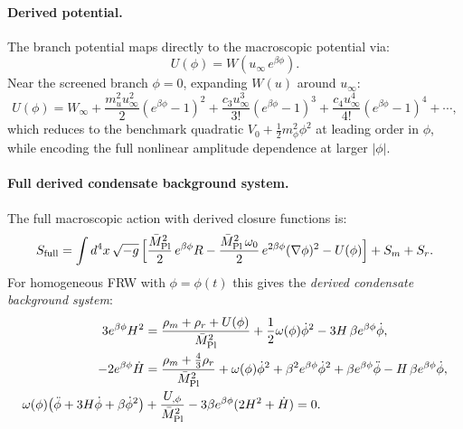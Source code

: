 \documentclass[11pt,a4paper]{article}
\numberwithin{equation}{section}
\begin{document}
\paragraph{Derived potential.}
The branch potential maps directly to the macroscopic potential via:
\begin{equation}
\boxed{U(\phi) = W(u_\infty\,e^{\beta\phi}).}
\label{eq:derived_potential}
\end{equation}
Near the screened branch $\phi=0$, expanding $W(u)$ around $u_\infty$:
\begin{equation}
U(\phi)
=
W_\infty
+\frac{m_u^2 u_\infty^2}{2}(e^{\beta\phi}-1)^2
+\frac{c_3 u_\infty^3}{3!}(e^{\beta\phi}-1)^3
+\frac{c_4 u_\infty^4}{4!}(e^{\beta\phi}-1)^4+\cdots,
\label{eq:derived_potential_expanded}
\end{equation}
which reduces to the benchmark quadratic $V_0+\frac12 m_\phi^2\phi^2$
at leading order in $\phi$, while encoding the full nonlinear amplitude
dependence at larger $|\phi|$.

\paragraph{Full derived condensate background system.}
The full macroscopic action with derived closure functions is:
\begin{equation}
S_{\rm full}
=
\int d^4x\,\sqrt{-g}\,
\Bigl[
\frac{\bar M_{\rm Pl}^2}{2}\,e^{\beta\phi}R
-\frac{\bar M_{\rm Pl}^2\,\omega_0}{2}\,e^{2\beta\phi}(\nabla\phi)^2
-U(\phi)
\Bigr]
+S_m+S_r.
\label{eq:full_condensate_action}
\end{equation}
For homogeneous FRW with $\phi=\phi(t)$ this gives the
\emph{derived condensate background system}:
\begin{align}
3e^{\beta\phi}H^2
&=
\frac{\rho_m+\rho_r+U(\phi)}{\bar M_{\rm Pl}^2}
+\frac12\omega(\phi)\dot\phi^2
-3H\,\beta e^{\beta\phi}\dot\phi,
\label{eq:condensate_friedmann1}
\\
-2e^{\beta\phi}\dot H
&=
\frac{\rho_m+\tfrac43\rho_r}{\bar M_{\rm Pl}^2}
+\omega(\phi)\dot\phi^2
+\beta^2 e^{\beta\phi}\dot\phi^2+\beta e^{\beta\phi}\ddot\phi
-H\,\beta e^{\beta\phi}\dot\phi,
\label{eq:condensate_friedmann2}
\\
\omega(\phi)\bigl(\ddot\phi+3H\dot\phi+\beta\dot\phi^2\bigr)
&+\frac{U_{,\phi}}{\bar M_{\rm Pl}^2}
-3\beta e^{\beta\phi}(2H^2+\dot H)=0.
\label{eq:condensate_scalar}
\end{align}
\end{document}
